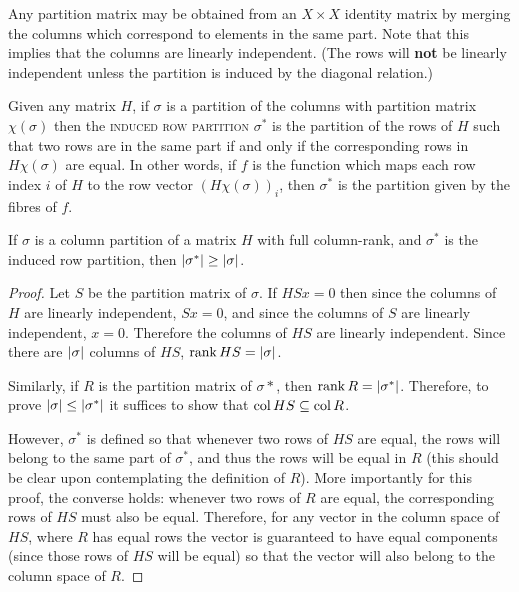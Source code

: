 \documentclass{report}
\begin{document}
    Any partition matrix may be obtained from an $X \times X$ identity matrix by
    merging the columns which correspond to elements in the same part.
    Note that this implies that the columns are linearly independent.
    (The rows will \textbf{not} be linearly independent unless the partition
    is induced by the diagonal relation.)

    Given any matrix $H$, if $\sigma$ is a partition of the columns with
    partition matrix $\chi(\sigma)$ then the \textsc{induced row partition}
    $\sigma^*$ is the partition of the rows of $H$ such that two rows are in the
    same part if and only if the corresponding rows in $H\chi(\sigma)$ are
    equal.  In other words, if $f$ is the function which maps each row index
    $i$ of $H$ to the row vector $(H\chi(\sigma))_i$, then $\sigma^*$ is the
    partition given by the fibres of $f$.
    \cite[Section 12.7]{godsil}

    \begin{lem} \label{larger-row-partition}
      If $\sigma$ is a column partition of a matrix $H$ with full column-rank,
      and $\sigma^*$ is the induced row partition,
      then $\left\lvert \sigma^* \right\rvert \geq \left\lvert \sigma \right\rvert$.
    \end{lem}

    \begin{proof}
      Let $S$ be the partition matrix of $\sigma$.
      If $HSx = 0$ then since the columns of $H$ are linearly independent,
      $Sx = 0$, and since the columns of $S$ are linearly independent,
      $x = 0$.  Therefore the columns of $HS$ are linearly independent.
      Since there are $\left\lvert \sigma \right\rvert$ columns of $HS$,
      $\operatorname{rank} HS = \left\lvert \sigma \right\rvert$.

      Similarly, if $R$ is the partition matrix of $\sigma*$,
      then $\operatorname{rank} R = \left\lvert \sigma^* \right\rvert$.  Therefore, to prove $\left\lvert \sigma \right\rvert \leq
      \left\lvert \sigma^* \right\rvert$ it suffices to show that $\operatorname{col} HS \subseteq \operatorname{col} R$.

      However, $\sigma^*$ is defined so that whenever two rows of $HS$ are equal,
      the rows will belong to the same part of $\sigma^*$,
      and thus the rows will be equal in $R$
      (this should be clear upon contemplating the definition of $R$).  
      More importantly for this proof, the converse holds:
      whenever two rows of $R$ are equal, the corresponding rows of $HS$ must
      also be equal.
      Therefore, for any vector in the column space of $HS$,
      where $R$ has equal rows the vector is guaranteed to have equal
      components (since those rows of $HS$ will be equal)
      so that the vector will also belong to the column space of $R$.
    \end{proof}
\end{document}
